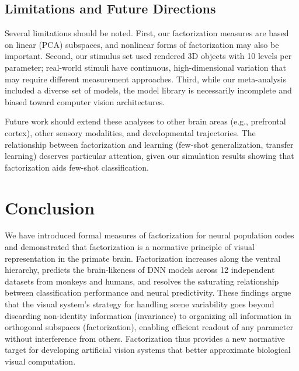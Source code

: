 \documentclass[11pt]{article}
\begin{document}
\subsection{Limitations and Future Directions}

Several limitations should be noted. First, our factorization measures are based on linear (PCA) subspaces, and nonlinear forms of factorization may also be important. Second, our stimulus set used rendered 3D objects with 10 levels per parameter; real-world stimuli have continuous, high-dimensional variation that may require different measurement approaches. Third, while our meta-analysis included a diverse set of models, the model library is necessarily incomplete and biased toward computer vision architectures.

Future work should extend these analyses to other brain areas (e.g., prefrontal cortex), other sensory modalities, and developmental trajectories. The relationship between factorization and learning (few-shot generalization, transfer learning) deserves particular attention, given our simulation results showing that factorization aids few-shot classification.

\section{Conclusion}

We have introduced formal measures of factorization for neural population codes and demonstrated that factorization is a normative principle of visual representation in the primate brain. Factorization increases along the ventral hierarchy, predicts the brain-likeness of DNN models across 12 independent datasets from monkeys and humans, and resolves the saturating relationship between classification performance and neural predictivity. These findings argue that the visual system's strategy for handling scene variability goes beyond discarding non-identity information (invariance) to organizing all information in orthogonal subspaces (factorization), enabling efficient readout of any parameter without interference from others. Factorization thus provides a new normative target for developing artificial vision systems that better approximate biological visual computation.



\end{document}
